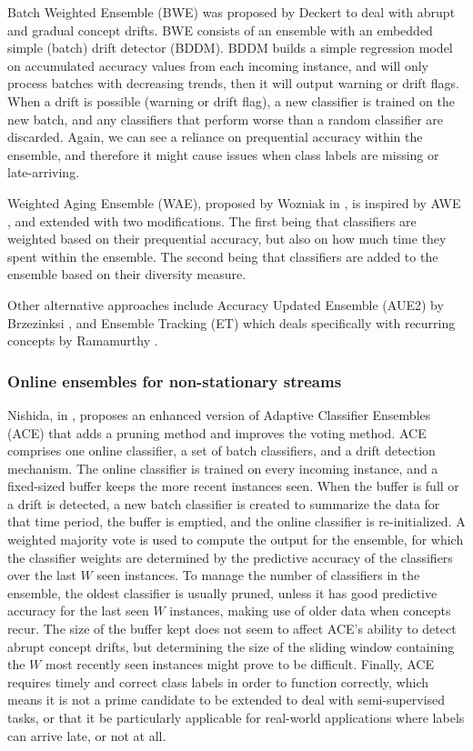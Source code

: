 Batch Weighted Ensemble (BWE) was proposed by Deckert \cite{deckert2011batch} to deal with abrupt and gradual concept drifts. BWE consists of an ensemble with an embedded simple (batch) drift detector (BDDM). BDDM builds a simple regression model on accumulated accuracy values from each incoming instance, and will only process batches with decreasing trends, then it will output warning or drift flags. When a drift is possible (warning or drift flag), a new classifier is trained on the new batch, and any classifiers that perform worse than a random classifier are discarded. Again, we can see a reliance on prequential accuracy within the ensemble, and therefore it might cause issues when class labels are missing or late-arriving.

Weighted Aging Ensemble (WAE), proposed by Wozniak in \cite{wozniak2013application}, is inspired by AWE \cite{wang2003mining}, and extended with two modifications. The first being that classifiers are weighted based on their prequential accuracy, but also on how much time they spent within the ensemble. The second being that classifiers are added to the ensemble based on their diversity measure.

Other alternative approaches include Accuracy Updated Ensemble (AUE2) by Brzezinksi \cite{brzezinski2014reacting}, and Ensemble Tracking (ET) which deals specifically with recurring concepts by Ramamurthy \cite{ramamurthy2007tracking}.

\subsubsection{Online ensembles for non-stationary streams}

Nishida, in \cite{nishida2007adaptive}, proposes an enhanced version of Adaptive Classifier Ensembles (ACE) that adds a pruning method and improves the voting method. ACE comprises one online classifier, a set of batch classifiers, and a drift detection mechanism. The online classifier is trained on every incoming instance, and a fixed-sized buffer keeps the more recent instances seen. When the buffer is full or a drift is detected, a new batch classifier is created to summarize the data for that time period, the buffer is emptied, and the online classifier is re-initialized. A weighted majority vote is used to compute the output for the ensemble, for which the classifier weights are determined by the predictive accuracy of the classifiers over the last $W$ seen instances. To manage the number of classifiers in the ensemble, the oldest classifier is usually pruned, unless it has good predictive accuracy for the last seen $W$ instances, making use of older data when concepts recur. The size of the buffer kept does not seem to affect ACE's ability to detect abrupt concept drifts, but determining the size of the sliding window containing the $W$ most recently seen instances might prove to be difficult.
Finally, ACE requires timely and correct class labels in order to function correctly, which means it is not a prime candidate to be extended to deal with semi-supervised tasks, or that it be particularly applicable for real-world applications where labels can arrive late, or not at all.

